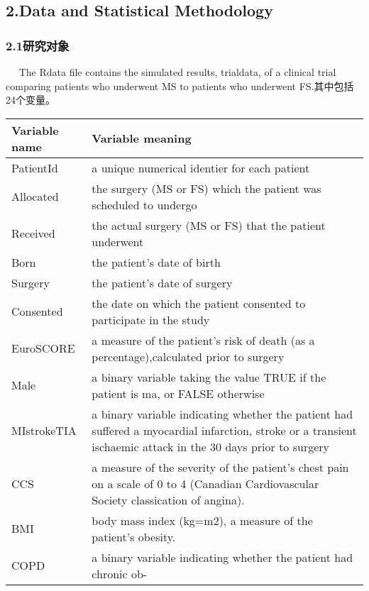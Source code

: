 \documentclass[
]{article}
\begin{document}
\hypertarget{data-and-statistical-methodology}{%
\subsection{2.Data and Statistical
Methodology}\label{data-and-statistical-methodology}}

\hypertarget{ux7814ux7a76ux5bf9ux8c61}{%
\subsubsection{2.1研究对象}\label{ux7814ux7a76ux5bf9ux8c61}}

  The Rdata file contains the simulated results, trialdata, of a
clinical trial comparing patients who underwent MS to patients who
underwent FS.其中包括24个变量。

\begin{longtable}[]{@{}
  >{\raggedright\arraybackslash}p{}
  >{\raggedright\arraybackslash}p{}@{}}
\toprule
Variable name & Variable meaning \\
\midrule
\endhead
PatientId & a unique numerical identier for each patient \\
Allocated & the surgery (MS or FS) which the patient was scheduled to
undergo \\
Received & the actual surgery (MS or FS) that the patient underwent \\
Born & the patient's date of birth \\
Surgery & the patient's date of surgery \\
Consented & the date on which the patient consented to participate in
the study \\
EuroSCORE & a measure of the patient's risk of death (as a
percentage),calculated prior to surgery \\
Male & a binary variable taking the value TRUE if the patient is ma, or
FALSE otherwise \\
MIstrokeTIA & a binary variable indicating whether the patient had
suffered a myocardial infarction, stroke or a transient ischaemic attack
in the 30 days prior to surgery \\
CCS & a measure of the severity of the patient's chest pain on a scale
of 0 to 4 (Canadian Cardiovascular Society classication of angina). \\
BMI & body mass index (kg=m2), a measure of the patient's obesity. \\
COPD & a binary variable indicating whether the patient had chronic ob-

\end{longtable}
\end{document}
